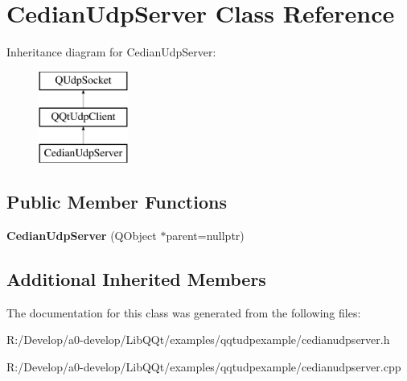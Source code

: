 \hypertarget{class_cedian_udp_server}{}\section{Cedian\+Udp\+Server Class Reference}
\label{class_cedian_udp_server}
Inheritance diagram for Cedian\+Udp\+Server\+:\begin{figure}[H]
\begin{center}
\leavevmode
\includegraphics[height=3.000000cm]{class_cedian_udp_server}
\end{center}
\end{figure}
\subsection*{Public Member Functions}
\begin{DoxyCompactItemize}
\item 
\mbox{\label{class_cedian_udp_server_a88ccc0b22f6756356fe7cb0f81af0b62}} 
{\bfseries Cedian\+Udp\+Server} (Q\+Object $\ast$parent=nullptr)
\end{DoxyCompactItemize}
\subsection*{Additional Inherited Members}


The documentation for this class was generated from the following files\+:\begin{DoxyCompactItemize}
\item 
R\+:/\+Develop/a0-\/develop/\+Lib\+Q\+Qt/examples/qqtudpexample/cedianudpserver.\+h\item 
R\+:/\+Develop/a0-\/develop/\+Lib\+Q\+Qt/examples/qqtudpexample/cedianudpserver.\+cpp\end{DoxyCompactItemize}
